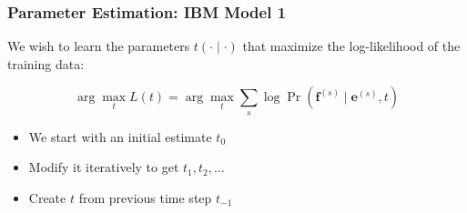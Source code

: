 \begin{frame}
\frametitle{Parameter Estimation: IBM Model 1}
\begin{block}{}
We wish to learn the parameters $t(\cdot \mid \cdot)$ that maximize
the log-likelihood of the training data:

\[ \arg\max_{t} L(t) = \arg\max_{t} \sum_s \log \Pr(\mathbf{f}^{(s)} \mid
\mathbf{e}^{(s)}, t) \]
\end{block}\pause

\begin{block}{}
\begin{itemize}
\item We start with an initial estimate $t_0$
\item Modify it iteratively to get $t_1, t_2, \ldots$
\item Create $t$ from previous time step $t_{-1}$
\end{itemize}

\end{block}
\end{frame}




